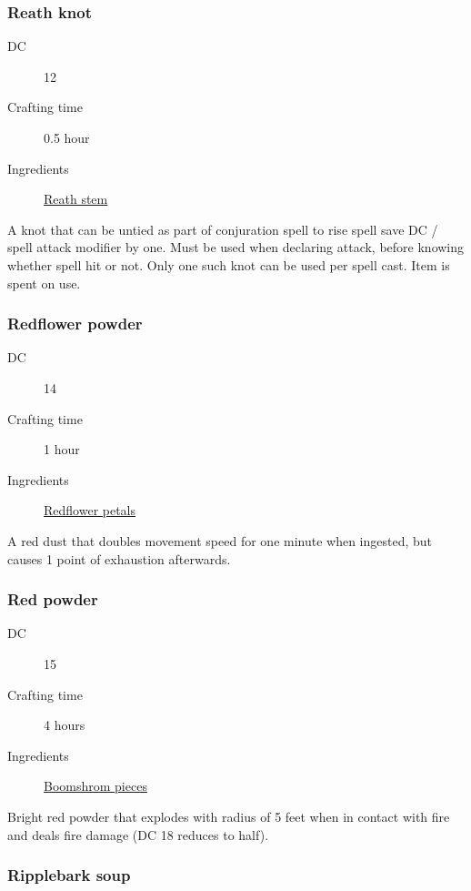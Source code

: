 \subsubsection{Reath knot}
\label{Reath knot}

\begin{description}
\item [DC] 12 \medicine
\item [Crafting time] 0.5 hour
\item [Ingredients] \hyperref[Reath]{Reath stem}
\end{description}

A knot that can be untied as part of conjuration spell to rise  spell save DC / spell attack modifier by one. Must be used when declaring attack, before knowing whether spell hit or not. Only one such knot can be used per spell cast. Item is spent on use.

\subsubsection{Redflower powder}
\label{Redflower powder}

\begin{description}
\item [DC] 14 \survival
\item [Crafting time] 1 hour
\item [Ingredients] \hyperref[Redflower]{Redflower petals}
\end{description}

A red dust that doubles movement speed for one minute when ingested, but causes 1 point of exhaustion afterwards.

\subsubsection{Red powder}
\label{Red powder}

\begin{description}
\item [DC] 15 \nature
\item [Crafting time] 4 hours
\item [Ingredients] \hyperref[Boomsrhoom]{Boomshrom pieces}
\end{description}

Bright red powder that explodes with radius of 5 feet when in contact with fire and deals  fire damage (DC 18 \dexteritysave{} reduces to half).

\subsubsection{Ripplebark soup}

